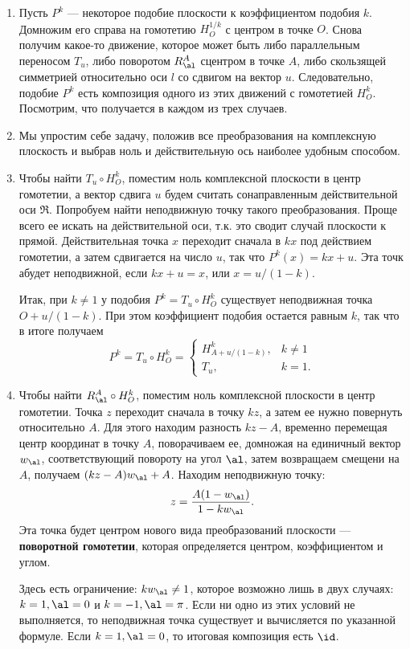 \begin{enumerate}


\item Пусть $P^k$ --- некоторое подобие плоскости к коэффициентом подобия $k$. Домножим его справа на гомотетию $H_O^{1/k}$  с центром в точке $O$. Снова получим какое-то движение, которое может быть либо параллельным переносом $T_u$, либо поворотом $R_\al^A$  сцентром в точке $A$, либо скользящей симметрией относительно оси $l$ со сдвигом на вектор $u$. Следовательно, подобие $P^k$ есть композиция одного из этих движений с гомотетией $H_O^k$. Посмотрим, что получается в каждом из трех случаев.
\item Мы упростим себе задачу, положив все преобразования на комплексную плоскость и выбрав ноль и действительную ось наиболее удобным способом.
\item Чтобы найти $T_u\circ H_O^k$, поместим ноль комплексной плоскости в центр гомотетии, а вектор сдвига $u$ будем считать сонаправленным действительной оси $\Re$. Попробуем найти неподвижную точку такого преобразования. Проще всего ее искать на действительной оси, т.к. это сводит случай плоскости к прямой. Действительная точка $x$ переходит сначала в $kx$ под действием гомотетии, а затем сдвигается на число $u$, так что $P^k(x)=kx+u$. Эта точк абудет неподвижной, если $kx+u=x$, или $x=u/(1-k)$.

Итак, при $k\ne 1$ у подобия $P^k=T_u\circ H_O^k$ существует неподвижная точка $O+u/(1-k)$. При этом коэффициент подобия остается равным $k$, так что в итоге получаем
$$
P^k=T_u\circ H_O^k = \begin{cases} H_{A+u/(1-k)}^k, & k\ne 1 \\ T_u, & k=1.\end{cases}
$$

\item Чтобы найти $R_\al^A\circ H_O^k$, поместим ноль комплексной плоскости в центр гомотетии. Точка $z$ переходит сначала в точку $kz$, а затем ее нужно повернуть относительно $A$. Для этого находим разность $kz-A$, временно перемещая центр координат в точку $A$, поворачиваем ее, домножая на единичный вектор $w_\al$, соответствующий повороту на угол $\al$, затем возвращаем смещени на $A$, получаем $(kz-A)w_\al+A$. Находим неподвижную точку:
$$
z = \frac{A(1-w_\al)}{1-kw_\al}.
$$
Эта точка будет центром нового вида преобразований плоскости --- \textbf{поворотной гомотетии}, которая определяется центром, коэффициентом и углом.

Здесь есть ограничение: $kw_\al\ne 1$, которое возможно лишь в двух случаях: $k=1,\al=0$ и $k=-1,\al=\pi$. Если ни одно из этих условий не выполняется, то неподвижная точка существует и вычисляется по указанной формуле. Если $k=1,\al=0$, то итоговая композиция есть $\id$.


\end{enumerate}
